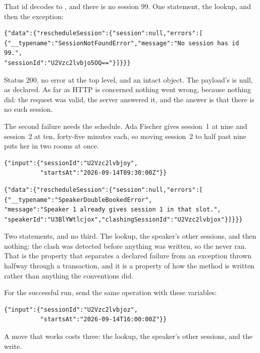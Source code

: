That id decodes to , and there is no session 99. One
statement, the lookup, and then the exception:

\begin{verbatim}
{"data":{"rescheduleSession":{"session":null,"errors":[
{"__typename":"SessionNotFoundError","message":"No session has id 99.",
"sessionId":"U2Vzc2lvbjo5OQ=="}]}}}
\end{verbatim}

%
Status 200, no error at the top level, and an intact  object.
The payload's  is null, as declared. As far as HTTP
is concerned nothing went wrong, because nothing did: the request was valid,
the server answered it, and the answer is that there is no such session.

%
The second failure needs the schedule. Ada Fischer gives session~1 at nine and
session~2 at ten, forty-five minutes each, so moving session~2 to half past
nine puts her in two rooms at once.

\begin{verbatim}
{"input":{"sessionId":"U2Vzc2lvbjoy",
          "startsAt":"2026-09-14T09:30:00Z"}}
\end{verbatim}

\begin{verbatim}
{"data":{"rescheduleSession":{"session":null,"errors":[
{"__typename":"SpeakerDoubleBookedError",
"message":"Speaker 1 already gives session 1 in that slot.",
"speakerId":"U3BlYWtlcjox","clashingSessionId":"U2Vzc2lvbjox"}]}}}
\end{verbatim}

%
Two statements, and no third. The lookup, the speaker's other sessions, and
then nothing: the clash was detected before anything was written, so the
 never ran. That is the property that separates a declared failure
from an exception thrown halfway through a transaction, and it is a property of
how the method is written rather than anything the conventions did.

%
For the successful run, send the same operation with these variables:

\begin{verbatim}
{"input":{"sessionId":"U2Vzc2lvbjoz",
          "startsAt":"2026-09-14T16:00:00Z"}}
\end{verbatim}

A move that works costs three: the lookup, the speaker's other sessions, and
the write.

